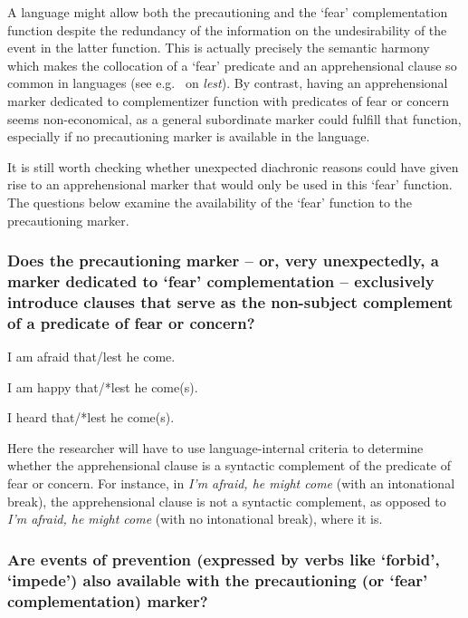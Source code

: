 \documentclass[output=paper,colorlinks,citecolor=brown]{langscibook}
\begin{document}
\noindent A language might allow both the precautioning and the `fear' complementation function despite the redundancy of the information on the undesirability of the event in the latter function. This is actually precisely the semantic harmony which makes the collocation of a `fear' predicate and an apprehensional clause so common in languages (see e.g.\ \cite{López-Couso2007} on  \textit{lest}). By contrast, having an apprehensional marker dedicated to complementizer function with predicates of fear or concern seems non-economical, as a general subordinate marker could fulfill that function, especially if no precautioning marker is available in the language.

It is still worth checking whether unexpected diachronic reasons could have given rise to an apprehensional marker that would only be used in this `fear' function. The questions below examine the availability of the `fear' function to the precautioning marker.


\subsubsection{Does the precautioning marker -- or, very unexpectedly, a marker dedicated to `fear' complementation -- exclusively introduce clauses that serve as the non-subject complement of a predicate of fear or concern?}
\label{2.6.1}

\ea \label{p58} I am afraid that\textnormal{/}lest he come.
\z

\ea \label{p59} I am happy that\textnormal{/*}lest he come(s).
\z

\ea \label{p60} I heard that\textnormal{/*}lest he come(s).
\z

\noindent Here the researcher will have to use language-internal criteria to determine whether the apprehensional clause is a syntactic complement of the predicate of fear or concern. For instance, in \textit{I'm afraid, he might come} (with an intonational break), the apprehensional clause is not a syntactic complement, as opposed to \textit{I'm afraid, he might come} (with no intonational break), where it is.

\subsubsection{Are events of prevention (expressed by verbs like `forbid', `impede') also available with the precautioning (or `fear' complementation) marker?}
\label{2.6.2}
\end{document}
